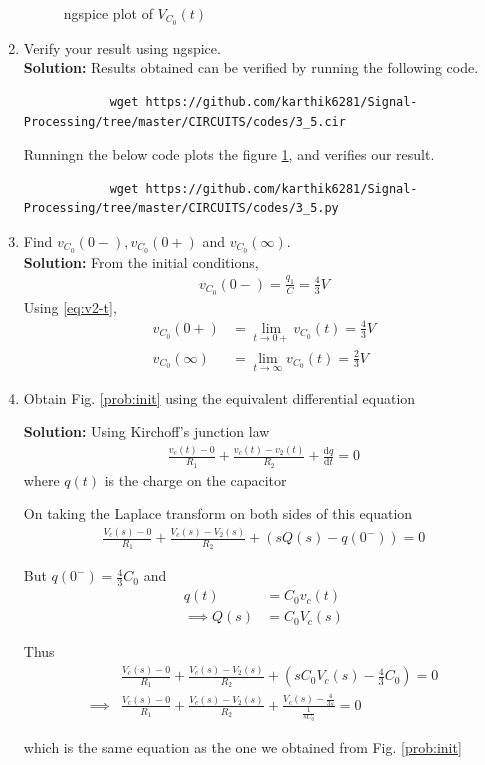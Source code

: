 \documentclass[journal,12pt,twocolumn]{IEEEtran}
\newcommand{\solution}{\noindent \textbf{Solution: }}
\providecommand{\brak}[1]{\ensuremath{\left(#1\right)}}
\providecommand{\der}[1]{\mathrm{d} #1}
\numberwithin{equation}{section}
\renewcommand\thesection{\arabic{section}}
\begin{document}
\begin{enumerate}[label=\arabic*.,ref=\thesection.\theenumi]
\begin{figure}[!ht]
			\caption{ngspice plot of $V_{C_0}(t)$} 
			\label{fig:ngspice2}
		\end{figure}
		\item Verify your result using ngspice.\\
		\solution Results obtained can be verified by running the following code.
		\begin{lstlisting}
			wget https://github.com/karthik6281/Signal-Processing/tree/master/CIRCUITS/codes/3_5.cir
		\end{lstlisting}
		Runningn the below code plots the figure \ref{fig:ngspice2}, and verifies our result.
		\begin{lstlisting}
			wget https://github.com/karthik6281/Signal-Processing/tree/master/CIRCUITS/codes/3_5.py
		\end{lstlisting}
		
		
		
		\item Find $v_{C_0}(0-), v_{C_0}(0+)$ and  $v_{C_0}(\infty) $.\\
		\solution From the initial conditions,
		\begin{align}
			v_{C_0}(0-) = \frac{q_1}{C} = {\frac{4}{3}}{V}
		\end{align}
		Using \eqref{eq:v2-t},
		\begin{align}
			v_{C_0}(0+) &= \lim_{t \to 0+}v_{C_0}(t) = {\frac{4}{3}}{V} \\
			v_{C_0}(\infty) &= \lim_{t \to \infty}v_{C_0}(t) = {\frac{2}{3}}{V}
		\end{align}
		
		\item Obtain Fig. \ref{prob:init} using the equivalent differential equation
		
		\solution Using Kirchoff's junction law
		\begin{align}
			\frac{v_c(t) - 0}{R_1} + \frac{v_c(t) - v_2(t)}{R_2} + \frac{\der{q}}{\der{t}} = 0
		\end{align}
		where $q(t)$ is the charge on the capacitor
		
		On taking the Laplace transform on both sides of this equation
		\begin{align}
			\frac{V_c(s) - 0}{R_1} + \frac{V_c(s) - V_2(s)}{R_2} + \brak{sQ(s) - q(0^-)} = 0
		\end{align}
		
		But $q(0^-) = \frac43 C_0$ and 
		\begin{align}
			q(t) &= C_0v_c(t) \\
			\implies Q(s) &= C_0V_c(s)
		\end{align}
		
		Thus
		\begin{align}
			&\frac{V_c(s) - 0}{R_1} + \frac{V_c(s) - V_2(s)}{R_2} + \brak{sC_0V_c(s) - \frac43 C_0} = 0 \\
			\implies &\frac{V_c(s) - 0}{R_1} + 	\frac{V_c(s) - V_2(s)}{R_2} + \frac{V_c(s) - \frac{4}{3s}}{\frac{1}{sC_0}} = 0 
		\end{align}
		
		which is the same equation as the one we obtained from Fig. \ref{prob:init}
	\end{enumerate}
	
\end{document}
